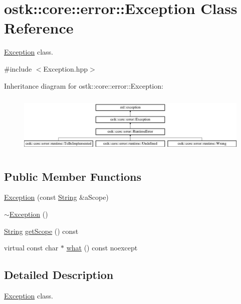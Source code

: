 \hypertarget{classostk_1_1core_1_1error_1_1_exception}{}\section{ostk\+:\+:core\+:\+:error\+:\+:Exception Class Reference}
\label{classostk_1_1core_1_1error_1_1_exception}


\hyperlink{classostk_1_1core_1_1error_1_1_exception}{Exception} class.  




{\ttfamily \#include $<$Exception.\+hpp$>$}

Inheritance diagram for ostk\+:\+:core\+:\+:error\+:\+:Exception\+:\begin{figure}[H]
\begin{center}
\leavevmode
\includegraphics[height=2.871795cm]{classostk_1_1core_1_1error_1_1_exception}
\end{center}
\end{figure}
\subsection*{Public Member Functions}
\begin{DoxyCompactItemize}
\item 
\hyperlink{classostk_1_1core_1_1error_1_1_exception_a27647e55b84a7a32cf8b24e575651d71}{Exception} (const \hyperlink{classostk_1_1core_1_1types_1_1_string}{String} \&a\+Scope)
\item 
\hyperlink{classostk_1_1core_1_1error_1_1_exception_ae44d71ced961433d0b3325ff176e4974}{$\sim$\+Exception} ()
\item 
\hyperlink{classostk_1_1core_1_1types_1_1_string}{String} \hyperlink{classostk_1_1core_1_1error_1_1_exception_a3778009187ea6841eff3bdd45d345144}{get\+Scope} () const
\item 
virtual const char $\ast$ \hyperlink{classostk_1_1core_1_1error_1_1_exception_ae34ebc20a97277da6e2472b6bb8e3812}{what} () const noexcept
\end{DoxyCompactItemize}


\subsection{Detailed Description}
\hyperlink{classostk_1_1core_1_1error_1_1_exception}{Exception} class. 

